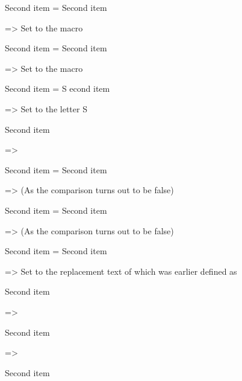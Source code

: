 \documentclass{article}
\begin{document}
\begin{enumerate}
\def \reserved@a {\@item }\def \reserved@b {\@noitemargtrue \@item [\@itemlabel ]}\futurelet \@let@token \@ifnch
Second item
=
\def \reserved@a {\@item }
\def \reserved@b {\@noitemargtrue \@item [\@itemlabel ]}\futurelet \@let@token \@ifnch
Second item

=> Set \reserved@a to the macro \@item

\def \reserved@b {\@noitemargtrue \@item [\@itemlabel ]}\futurelet \@let@token \@ifnch
Second item
=
\def \reserved@b {\@noitemargtrue \@item [\@itemlabel ]}
\futurelet \@let@token \@ifnch
Second item

=> Set \reserved@b to the macro \@noitemargtrue \@item [\@itemlabel ]

\futurelet \@let@token \@ifnch
Second item
=
\futurelet
    \@let@token
    \@ifnch
    S
econd item

=> Set \@let@token to the letter S

\@ifnch Second item

=>

\ifx \@let@token \@sptoken \let \reserved@c \@xifnch \else \ifx \@let@token \reserved@d \let \reserved@c \reserved@a \else \let \reserved@c \reserved@b \fi \fi \reserved@c Second item
=
\ifx
    \@let@token
    \@sptoken
  \let \reserved@c \@xifnch
  \else
    \ifx \@let@token \reserved@d \let \reserved@c \reserved@a \else \let \reserved@c \reserved@b \fi \fi \reserved@c Second item

=> (As the comparison \ifx \@let@token \@sptoken turns out to be false)

\ifx \@let@token \reserved@d \let \reserved@c \reserved@a \else \let \reserved@c \reserved@b \fi \fi \reserved@c Second item
=
\ifx
    \@let@token
    \reserved@d
  \let \reserved@c \reserved@a
  \else
    \let \reserved@c \reserved@b \fi \fi \reserved@c Second item

=> (As the comparison \ifx \@let@token \reserved@d turns out to be false)

\let \reserved@c \reserved@b \fi \fi \reserved@c Second item
=
\let \reserved@c \reserved@b
\fi \fi \reserved@c Second item

=> Set \reserved@c to the replacement text of \reserved@b which was earlier defined as \@noitemargtrue \@item [\@itemlabel ]

\fi \fi \reserved@c Second item

=>

\fi \reserved@c Second item

=>

\reserved@c Second item


\end{enumerate}
\end{document}
